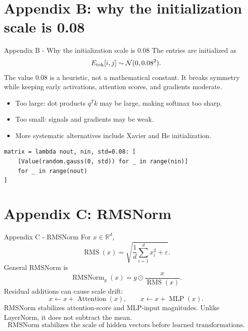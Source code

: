 \documentclass[
  xcolor={svgnames,dvipsnames},
  hyperref={pagebackref,bookmarks},
  aspectratio=169,
  11pt
]{beamer}
\begin{document}
\section{Appendix B: why the initialization scale is 0.08}
\begin{frame}[fragile]{Appendix B - Why the initialization scale is $0.08$}
\small
The entries are initialized as
\[
E_{\rm tok}[i,j]\sim\mathcal N(0,0.08^2).
\]
The value $0.08$ is a heuristic, not a mathematical constant. It breaks symmetry while keeping early activations, attention scores, and gradients moderate.
\begin{itemize}
  \item Too large: dot products $q^Tk$ may be large, making softmax too sharp.
  \item Too small: signals and gradients may be weak.
  \item More systematic alternatives include Xavier and He initialization.
\end{itemize}
\begin{lstlisting}
matrix = lambda nout, nin, std=0.08: [
    [Value(random.gauss(0, std)) for _ in range(nin)]
    for _ in range(nout)
]
\end{lstlisting}
\end{frame}

\section{Appendix C: RMSNorm}
\begin{frame}{Appendix C - RMSNorm}
\small
For $x\in\mathbb R^d$,
\[
\operatorname{RMS}(x)=\sqrt{\frac1d\sum_{i=1}^d x_i^2+\varepsilon}.
\]
General RMSNorm is
\[
\operatorname{RMSNorm}_g(x)=g\odot\frac{x}{\operatorname{RMS}(x)}.
\]
Residual additions can cause scale drift:
\[
x\leftarrow x+\operatorname{Attention}(x),\qquad x\leftarrow x+\operatorname{MLP}(x).
\]
RMSNorm stabilizes attention-score and MLP-input magnitudes. Unlike LayerNorm, it does not subtract the mean.
\[
\boxed{\text{RMSNorm stabilizes the scale of hidden vectors before learned transformations.}}
\]
\end{frame}
\end{document}
